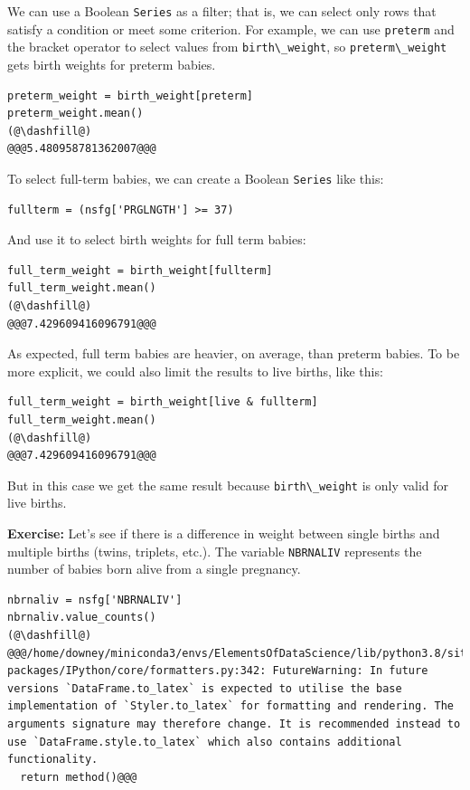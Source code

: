 We can use a Boolean \passthrough{\lstinline!Series!} as a filter; that
is, we can select only rows that satisfy a condition or meet some
criterion. For example, we can use \passthrough{\lstinline!preterm!} and
the bracket operator to select values from
\passthrough{\lstinline!birth\_weight!}, so
\passthrough{\lstinline!preterm\_weight!} gets birth weights for preterm
babies.

\begin{lstlisting}[]
preterm_weight = birth_weight[preterm]
preterm_weight.mean()
(@\dashfill@)
@@@5.480958781362007@@@
\end{lstlisting}

To select full-term babies, we can create a Boolean
\passthrough{\lstinline!Series!} like this:

\begin{lstlisting}[]
fullterm = (nsfg['PRGLNGTH'] >= 37)
\end{lstlisting}

And use it to select birth weights for full term babies:

\begin{lstlisting}[]
full_term_weight = birth_weight[fullterm]
full_term_weight.mean()
(@\dashfill@)
@@@7.429609416096791@@@
\end{lstlisting}

As expected, full term babies are heavier, on average, than preterm
babies. To be more explicit, we could also limit the results to live
births, like this:

\begin{lstlisting}[]
full_term_weight = birth_weight[live & fullterm]
full_term_weight.mean()
(@\dashfill@)
@@@7.429609416096791@@@
\end{lstlisting}

But in this case we get the same result because
\passthrough{\lstinline!birth\_weight!} is only valid for live births.

\textbf{Exercise:} Let's see if there is a difference in weight between
single births and multiple births (twins, triplets, etc.). The variable
\passthrough{\lstinline!NBRNALIV!} represents the number of babies born
alive from a single pregnancy.

\begin{lstlisting}[]
nbrnaliv = nsfg['NBRNALIV']
nbrnaliv.value_counts()
(@\dashfill@)
@@@/home/downey/miniconda3/envs/ElementsOfDataScience/lib/python3.8/site-packages/IPython/core/formatters.py:342: FutureWarning: In future versions `DataFrame.to_latex` is expected to utilise the base implementation of `Styler.to_latex` for formatting and rendering. The arguments signature may therefore change. It is recommended instead to use `DataFrame.style.to_latex` which also contains additional functionality.
  return method()@@@
\end{lstlisting}

